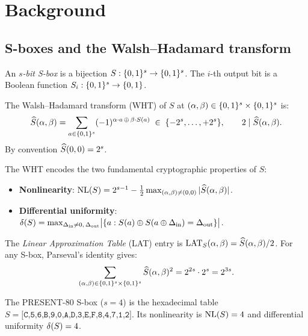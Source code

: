 \section{Background}\label{sec:background}

\subsection{S-boxes and the Walsh--Hadamard transform}

An \emph{$s$-bit S-box} is a bijection $S : \{0,1\}^{s} \to \{0,1\}^{s}$.
The $i$-th output bit is a Boolean function $S_i : \{0,1\}^{s}\to\{0,1\}$.

\begin{definition}\label{def:wht}
The Walsh--Hadamard transform (WHT) of $S$ at $(\alpha,\beta)\in\{0,1\}^{s}\times\{0,1\}^{s}$ is:
\begin{equation}\label{eq:wht}
  \widehat{S}(\alpha,\beta)
  = \sum_{a\in\{0,1\}^{s}} (-1)^{\alpha\cdot a\,\oplus\,\beta\cdot S(a)}
  \;\in\; \{-2^s,\ldots,+2^s\},
  \qquad 2\mid\widehat{S}(\alpha,\beta).
\end{equation}
By convention $\widehat{S}(0,0)=2^s$.
\end{definition}

The WHT encodes the two fundamental cryptographic properties of $S$:
\begin{itemize}
  \item \textbf{Nonlinearity}:
    $\mathrm{NL}(S) = 2^{s-1} - \tfrac{1}{2}\max_{(\alpha,\beta)\neq(0,0)}|\widehat{S}(\alpha,\beta)|$.
  \item \textbf{Differential uniformity}:
    $\delta(S) = \max_{\Delta_{\mathrm{in}}\neq 0,\,\Delta_{\mathrm{out}}}
    \bigl|\{a : S(a)\oplus S(a\oplus\Delta_{\mathrm{in}})=\Delta_{\mathrm{out}}\}\bigr|$.
\end{itemize}

The \emph{Linear Approximation Table} (LAT) entry is $\mathrm{LAT}_S(\alpha,\beta) = \widehat{S}(\alpha,\beta)/2$.
For any S-box, Parseval's identity gives:
\begin{equation}\label{eq:parseval}
  \sum_{(\alpha,\beta)\in\{0,1\}^{s}\times\{0,1\}^{s}} \widehat{S}(\alpha,\beta)^2 = 2^{2s}\cdot 2^s = 2^{3s}.
\end{equation}

\begin{example}\label{ex:present}
The PRESENT-80 S-box ($s=4$) is the hexadecimal table
$S = \texttt{[C,5,6,B,9,0,A,D,3,E,F,8,4,7,1,2]}$.
Its nonlinearity is $\mathrm{NL}(S)=4$ and differential uniformity $\delta(S)=4$.
\end{example}

